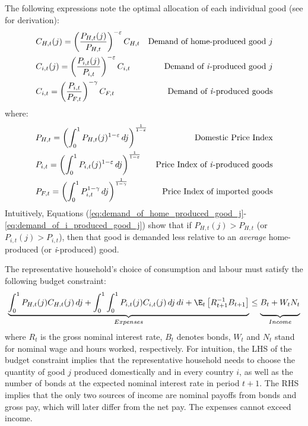 The following expressions note the optimal allocation of each individual good (see \textcite[83]{jordigal_2015_monetary} for derivation):
\begin{align}
 &C_{H,t}(j) = \left( \frac{P_{H,t}(j)}{P_{H,t}}\right)^{-\varepsilon}C_{H,t} & \text{Demand of home-produced good $j$}\label{eq:demand_of_home_produced_good_j}\\
 &C_{i,t}(j) = \left( \frac{P_{i,t}(j)}{P_{i,t}}\right)^{-\varepsilon}C_{i,t} & \text{Demand of \textit{i}-produced good $j$} \label{eq:demand_of_i_produced_good_j}\\ 
 &C_{i,t} = \left( \frac{P_{i,t}}{P_{F,t}}\right)^{-\gamma}C_{F,t} & \text{Demand of \textit{i}-produced goods}
 \label{eq:optimal_imported_consumption}
\end{align}
where:
\begin{align}
 &P_{H,t} = \left( \int_{0}^{1} P_{H,t}(j)^{1-\varepsilon} \,dj \right)^{\frac{1}{1-\varepsilon}} \hfill \label{eq:domestic_price_index} & \text{Domestic Price Index} \\
 &P_{i,t} = \left( \int_{0}^{1} P_{i,t}(j)^{1-\varepsilon} \,dj \right)^{\frac{1}{1-\varepsilon}} \hfill & \text{Price Index of \textit{i}-produced goods} \\
 &P_{F,t} = \left( \int_{0}^{1} P_{i,t}^{1-\gamma} \,dj \right)^{\frac{1}{1-\gamma}} \hfill \label{eq:price_index_imported_goods} & \text{Price Index of imported goods}
\end{align}
Intuitively, Equations (\ref{eq:demand_of_home_produced_good_j}-\ref{eq:demand_of_i_produced_good_j}) show that if $P_{H,t}(j) > P_{H,t}$ (or $P_{i,t}(j) > P_{i,t}$), then that good is demanded less relative to an \textit{average} home-produced (or \textit{i}-produced) good.

The representative household's choice of consumption and labour must satisfy the following budget constraint:
\begin{equation}
 \underbrace{\int_{0}^{1} P_{H,t}(j)C_{H,t}(j) \,dj + \int_{0}^{1} \int_{0}^{1} P_{i,t}(j)C_{i,t}(j) \,dj\,di + \E_t \left[ R^{-1}_{t+1} B_{t+1} \right]}_{Expenses} \leq \underbrace{\vphantom{\int_{0}^{1}} B_t + W_t N_t}_{Income}
\end{equation}
where $R_t$ is the gross nominal interest rate, $B_t$ denotes bonds, $W_t$ and $N_t$ stand for nominal wage and hours worked, respectively. For intuition, the LHS of the budget constraint implies that the representative household needs to choose the quantity of good $j$ produced domestically and in every country $i$, as well as the number of bonds at the expected nominal interest rate in period $t+1$. The RHS implies that the only two sources of income are nominal payoffs from bonds and gross pay, which will later differ from the net pay. The expenses cannot exceed income.

